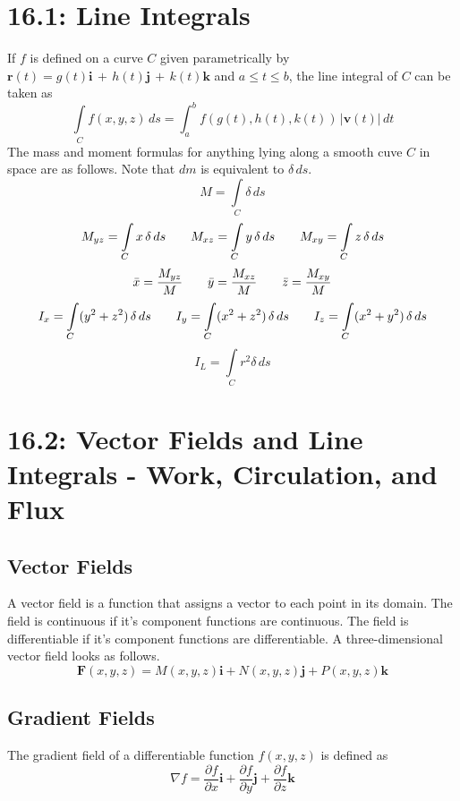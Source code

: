 \documentclass{article}
\begin{document}
\section*{16.1: Line Integrals}
If \(f\) is defined on a curve \(C\) given parametrically by \(\textbf{r}(t)=g(t)\textbf{i}\,+\,h(t)\textbf{j}\,+\,k(t)\textbf{k}\) and \(a\leq t\leq b\), the line integral of \(C\) can be taken as
\[\int\limits_Cf(x,y,z)\,ds=\int_a^bf(g(t), h(t), k(t))\,|\textbf{v}(t)|\,dt\]
The mass and moment formulas for anything lying along a smooth cuve \(C\) in space are as follows. Note that \(dm\) is equivalent to \(\delta\,ds\).
\[M=\int\limits_C\delta\,ds\]
\[M_{yz}=\int\limits_Cx\,\delta\,ds\hspace{7 mm}M_{xz}=\int\limits_Cy\,\delta\,ds\hspace{7 mm}M_{xy}=\int\limits_Cz\,\delta\,ds\]
\[\bar{x}=\frac{M_{yz}}{M}\hspace{7 mm}\bar{y}=\frac{M_{xz}}{M}\hspace{7 mm}\bar{z}=\frac{M_{xy}}{M}\]
\[I_x=\int\limits_C(y^2+z^2)\,\delta\,ds\hspace{7 mm}I_y=\int\limits_C(x^2+z^2)\,\delta\,ds\hspace{7 mm}I_z=\int\limits_C(x^2+y^2)\,\delta\,ds\]
\[I_L=\int\limits_Cr^2\delta\,ds\]
\section*{16.2: Vector Fields and Line Integrals - Work, Circulation, and Flux}
\subsection*{Vector Fields}
A vector field is a function that assigns a vector to each point in its domain. The field is continuous if it's component functions are continuous. The field is differentiable if it's component functions are differentiable. A three-dimensional vector field looks as follows.
\[\textbf{F}(x,y,z)=M(x,y,z)\textbf{i}+N(x,y,z)\textbf{j}+P(x,y,z)\textbf{k}\]
\subsection*{Gradient Fields}
The gradient field of a differentiable function \(f(x,y,z)\) is defined as
\[\nabla f=\frac{\partial f}{\partial x}\textbf{i}+\frac{\partial f}{\partial y}\textbf{j}+\frac{\partial f}{\partial z}\textbf{k}\]
\end{document}
